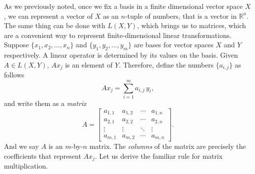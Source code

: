 \documentclass[12pt]{book}
\newcommand{\R}{{\mathbb{R}}}
\newcommand{\myindex}[1]{#1\index{#1}}
\theoremstyle{plain}
\theoremstyle{remark}
\theoremstyle{definition}
\theoremstyle{exercise}
\theoremstyle{example}
\begin{document}
As we previously noted, once we fix a basis in a finite dimensional
vector space $X$, we can represent a vector of $X$ as an $n$-tuple of
numbers, that is a vector in $\R^n$.  The same thing
can be done with $L(X,Y)$, which brings us to matrices,
which are a convenient way to represent
finite-dimensional linear transformations.
Suppose $\{ x_1, x_2, \ldots, x_n \}$ and $\{ y_1, y_2, \ldots, y_m \}$
are bases for vector spaces $X$ and $Y$ respectively.  A linear operator is 
determined by its values on the basis.  Given $A \in L(X,Y)$,
$A x_j$ is an element of $Y$.  Therefore,
define the numbers
$\{ a_{i,j} \}$ as follows
\begin{equation*}
A x_j = \sum_{i=1}^m a_{i,j} \, y_i ,
\end{equation*}
and write them as a \emph{\myindex{matrix}}
\begin{equation*}
A =
\begin{bmatrix}
a_{1,1} & a_{1,2} & \cdots & a_{1,n} \\
a_{2,1} & a_{2,2} & \cdots & a_{2,n} \\
\vdots & \vdots & \ddots & \vdots \\
a_{m,1} & a_{m,2} & \cdots & a_{m,n}
\end{bmatrix} .
\end{equation*}
And we say $A$ is an $m$-by-$n$ matrix.
The \emph{\myindex{columns}} of the matrix are precisely the coefficients
that represent $A x_j$.
Let us derive the familiar rule for matrix multiplication.
\end{document}
